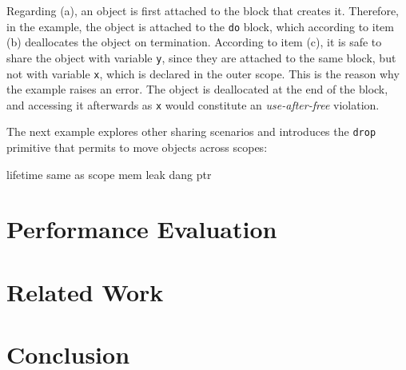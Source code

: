 \documentclass[12pt]{article}
\newcommand{\code}[1] {\texttt{\footnotesize{#1}}}
\begin{document}
Regarding (a), an object is first attached to the block that creates it.
Therefore, in the example, the object is attached to the \code{do} block, which
according to item (b) deallocates the object on termination.
According to item (c), it is safe to share the object with variable \code{y},
since they are attached to the same block, but not with variable \code{x},
which is declared in the outer scope.
This is the reason why the example raises an error.
The object is deallocated at the end of the block, and accessing it afterwards
as \code{x} would constitute an \emph{use-after-free} violation.

The next example explores other sharing scenarios and introduces the
\code{drop} primitive that permits to move objects across scopes:

%
lifetime same as scope
mem leak
dang ptr

\section{Performance Evaluation}
\label{sec.eval}

\section{Related Work}
\label{sec.related}

\section{Conclusion}
\label{sec.conclusion}
\end{document}

